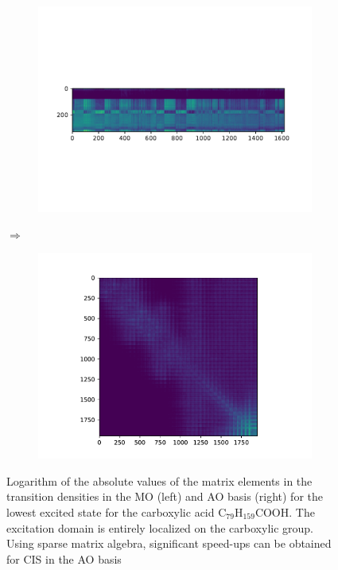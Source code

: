 \begin{figure}
\centering
\begin{subfigure}{0.3\linewidth}
\centering
\includegraphics[scale=0.6]{Pics/CISDENSE}
\caption{}
\end{subfigure}
$\Longrightarrow$
\begin{subfigure}{0.6\linewidth}
\centering
\includegraphics[scale=0.6]{Pics/CIS}
\caption{}
\end{subfigure}
\caption{Logarithm of the absolute values of the matrix elements in the transition densities in the MO (left) and AO basis (right) for the lowest excited state for the carboxylic acid C$_{79}$H$_{159}$COOH. The excitation domain is entirely localized on the carboxylic group. Using sparse matrix algebra, significant speed-ups can be obtained for CIS in the AO basis}
\label{fig:CISDENSE}
\end{figure}

